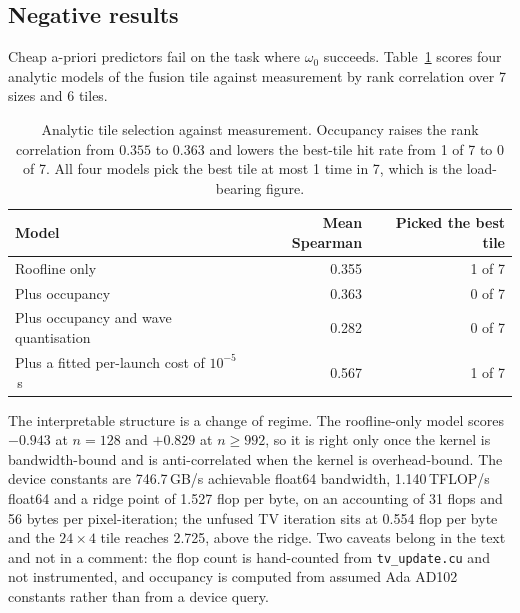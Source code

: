 \subsection{Negative results}
\label{sec:exp:negative}

Cheap a-priori predictors fail on the task where $\omega_0$ succeeds.
Table~\ref{tab:roofline} scores four analytic models of the fusion tile against
measurement by rank correlation over 7 sizes and 6 tiles.

\begin{table}[t]
\centering
\caption{Analytic tile selection against measurement. Occupancy raises the rank
correlation from $0.355$ to $0.363$ and lowers the best-tile hit rate from 1 of
7 to 0 of 7. All four models pick the best tile at most 1 time in 7, which is
the load-bearing figure.}
\label{tab:roofline}
\begin{tabular}{@{}lrr@{}}
\toprule
Model & Mean Spearman & Picked the best tile \\
\midrule
Roofline only                        & 0.355 & 1 of 7 \\
Plus occupancy                       & 0.363 & 0 of 7 \\
Plus occupancy and wave quantisation & 0.282 & 0 of 7 \\
Plus a fitted per-launch cost of $10^{-5}$\,s & 0.567 & 1 of 7 \\
\bottomrule
\end{tabular}
\end{table}

The interpretable structure is a change of regime. The roofline-only model
scores $-0.943$ at $n=128$ and $+0.829$ at $n \geq 992$, so it is right only
once the kernel is bandwidth-bound and is anti-correlated when the kernel is
overhead-bound. The device constants are 746.7\,GB/s achievable float64
bandwidth, 1.140\,TFLOP/s float64 and a ridge point of 1.527 flop per byte, on
an accounting of 31 flops and 56 bytes per pixel-iteration; the unfused TV
iteration sits at 0.554 flop per byte and the $24\times4$ tile reaches 2.725,
above the ridge. Two caveats belong in the text and not in a comment: the flop
count is hand-counted from \texttt{tv\_update.cu} and not instrumented, and
occupancy is computed from assumed Ada AD102 constants rather than from a
device query.

